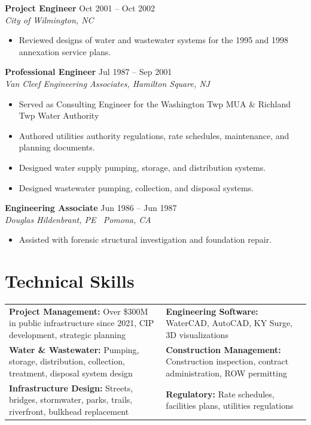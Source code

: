 \documentclass[10pt, letterpaper]{article}
\newcommand{\job}[3]{%
  \vspace{4pt}
  \noindent
  \textbf{#1} \hfill #3 \\
  \textit{#2}
  \vspace{1pt}
}
\begin{document}
\job{Project Engineer}{City of Wilmington, NC}{Oct 2001 -- Oct 2002}
\begin{itemize}
  \item Reviewed designs of water and wastewater systems for the 1995 and 1998 annexation service plans.
\end{itemize}

\job{Professional Engineer}{Van Cleef Engineering Associates, Hamilton Square, NJ}{Jul 1987 -- Sep 2001}
\begin{itemize}
  \item Served as Consulting Engineer for the Washington Twp MUA \& Richland Twp Water Authority
  \item Authored utilities authority regulations, rate schedules, maintenance, and planning documents.
  \item Designed water supply pumping, storage, and distribution systems.
  \item Designed wastewater pumping, collection, and disposal systems.
\end{itemize}

\job{Engineering Associate}{Douglas Hildenbrant, PE \textbullet\ Pomona, CA}{Jun 1986 -- Jun 1987}
\begin{itemize}
  \item Assisted with forensic structural investigation and foundation repair.
\end{itemize}

\section{Technical Skills}

\begin{tabular}{@{}p{3.5in}p{3.5in}@{}}
\textbf{Project Management:} Over \$300M in public infrastructure since 2021, CIP development, strategic planning &
\textbf{Engineering Software:} WaterCAD, AutoCAD, KY Surge, 3D visualizations \\[3pt]

\textbf{Water \& Wastewater:} Pumping, storage, distribution, collection, treatment, disposal system design &
\textbf{Construction Management:} Construction inspection, contract administration, ROW permitting \\[3pt]

\textbf{Infrastructure Design:} Streets, bridges, stormwater, parks, trails, riverfront, bulkhead replacement &
\textbf{Regulatory:} Rate schedules, facilities plans, utilities regulations \\
\end{tabular}
\end{document}
